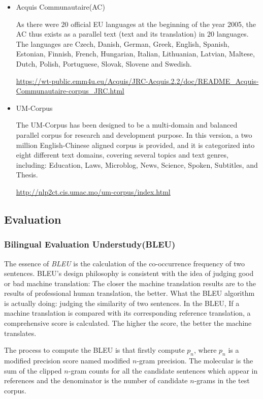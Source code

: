 \documentclass[a4paper, 12pt]{article}
\begin{document}
\begin{itemize}
	\item Acquis Communautaire(AC)
	
	As there were $20$ official EU languages at the beginning of the year 2005, the AC thus exists as a parallel text (text and its translation) in $20$ languages. The languages are Czech, Danish, German, Greek, English, Spanish, Estonian, Finnish, French, Hungarian, Italian, Lithuanian, Latvian, Maltese, Dutch, Polish, Portuguese, Slovak, Slovene and Swedish.
	
	\url{https://wt-public.emm4u.eu/Acquis/JRC-Acquis.2.2/doc/README_Acquis-Communautaire-corpus_JRC.html}	
	
	\item UM-Corpus\cite{tian2014corpus}
	
	The UM-Corpus has been designed to be a multi-domain and balanced parallel corpus for research and development purpose. In this version, a two million English-Chinese aligned corpus is provided, and it is categorized into eight different text domains, covering several topics and text genres, including: Education, Laws, Microblog, News, Science, Spoken, Subtitles, and Thesis.	
	
	\url{http://nlp2ct.cis.umac.mo/um-corpus/index.html}
	
\end{itemize}

\subsection{Evaluation}
\subsubsection{Bilingual Evaluation Understudy(BLEU)}
The essence of \textsl{BLEU} is the calculation of the co-occurrence frequency of two sentences\cite{papineni2002bleu}. BLEU's design philosophy is consistent with the idea of judging good or bad machine translation: The closer the machine translation results are to the results of professional human translation, the better. What the BLEU algorithm is actually doing: judging the similarity of two sentences. In the BLEU, If a machine translation is compared with its corresponding reference translation, a comprehensive score is calculated. The higher the score, the better the machine translates.

The process to compute the BLEU is that firstly compute $p_n$,
where $p_n$ is a modified precision score named modified $n$-gram precision. The molecular is the sum of the clipped $n$-gram counts for all the candidate sentences which appear in references and the denominator is the number of candidate $n$-grams in the test corpus.
\end{document}

